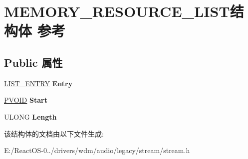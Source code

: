 \hypertarget{struct_m_e_m_o_r_y___r_e_s_o_u_r_c_e___l_i_s_t}{}\section{M\+E\+M\+O\+R\+Y\+\_\+\+R\+E\+S\+O\+U\+R\+C\+E\+\_\+\+L\+I\+S\+T结构体 参考}
\label{struct_m_e_m_o_r_y___r_e_s_o_u_r_c_e___l_i_s_t}
\subsection*{Public 属性}
\begin{DoxyCompactItemize}
\item 
\mbox{\label{struct_m_e_m_o_r_y___r_e_s_o_u_r_c_e___l_i_s_t_a859b108a4390cd2203f5825f134750f1}} 
\hyperlink{struct___l_i_s_t___e_n_t_r_y}{L\+I\+S\+T\+\_\+\+E\+N\+T\+RY} {\bfseries Entry}
\item 
\mbox{\label{struct_m_e_m_o_r_y___r_e_s_o_u_r_c_e___l_i_s_t_ab1db0e46044fc3d8b4b893abb84a6a95}} 
\hyperlink{interfacevoid}{P\+V\+O\+ID} {\bfseries Start}
\item 
\mbox{\label{struct_m_e_m_o_r_y___r_e_s_o_u_r_c_e___l_i_s_t_a69100fc53b01d29b423c735d33e3e5b2}} 
U\+L\+O\+NG {\bfseries Length}
\end{DoxyCompactItemize}


该结构体的文档由以下文件生成\+:\begin{DoxyCompactItemize}
\item 
E\+:/\+React\+O\+S-\/0../drivers/wdm/audio/legacy/stream/stream.\+h\end{DoxyCompactItemize}
